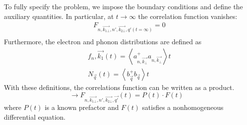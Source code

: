 \documentclass{article}
\begin{document}
To fully specify the problem, we impose the boundary conditions and define the auxiliary quantities. In particular, at $t\to \infty$ the correlation function vanishes:
\begin{align*}
    & F_{n,\vec{k_{1\bot}}, n', \vec{k_{2\bot}},q'(t = \infty )} = 0 \\
\end{align*}
Furthermore, the electron and phonon distributions are defined as
\begin{align*}
    & f_n, \vec{k_{1}}(t) = \left \langle a^+_{n, \vec{k_{\bot}}}a_{n, \vec{k_\bot}} \right \rangle t \\
    & N_{\vec{q}}(t) = \left \langle b^+_{\vec{q}} b_{\vec{q}} \right\rangle t
\end{align*}
With these definitions, the correlations function can be written as a product.
\begin{equation*}
    \rightarrow F_{n, \vec{k_{1\bot}}, n', \vec{k_{2\bot}}, \vec{q'}}{(t)}= P(t) \cdot F (t)
\end{equation*}
where $P(t)$ is a known prefactor and $F(t)$ satisfies a nonhomogeneous differential equation.
\end{document}
